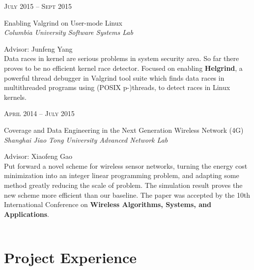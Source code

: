\documentclass[10pt]{article} %
\begin{document}
{\begin{minipage}[t]{0.5\textwidth}

{\raggedleft\textsc{July 2015 -- Sept 2015}\par}

{\raggedright\large Enabling Valgrind on User-mode Linux\\
\textit{{\color{stress}Columbia University} Software Systems Lab}\\[5pt]}
Advisor: Junfeng Yang\\
\normalsize{Data races in kernel are serious problems in system security area. So far there proves to be no efficient kernel race detector. Focused on enabling \textbf{Helgrind}, a powerful thread debugger in Valgrind tool suite which finds data races in multithreaded programs using (POSIX p-)threads, to detect races in Linux kernels.}\\


{\raggedleft\textsc{April 2014 -- July 2015}\par}

{\raggedright\large Coverage and Data Engineering in the Next Generation Wireless Network (4G)\\
\textit{{\color{stress}Shanghai Jiao Tong University} Advanced Network Lab}\\[5pt]}
Advisor: Xiaofeng Gao\\
\normalsize{Put forward a novel scheme for wireless sensor networks, turning the energy cost minimization into an integer linear programming problem, and adapting some method greatly reducing the scale of problem. The simulation result proves the new scheme more efficient than our baseline. The paper was accepted by the 10th International Conference on \textbf{Wireless Algorithms, Systems, and Applications}.}\\ \\


\section{Project Experience} 



\end{minipage}}
\end{document}
